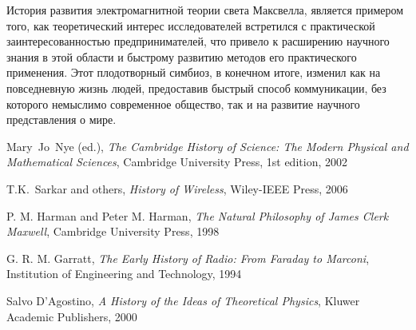 \documentclass[12pt, oneside, a4paper]{article}
\begin{document}
История развития электромагнитной теории света Максвелла, является примером того, как теоретический интерес исследователей встретился с практической заинтересованностью предпринимателей, что привело  к расширению научного знания в этой области и быстрому развитию методов его практического применения. Этот плодотворный симбиоз, в конечном итоге, изменил как на повседневную жизнь людей, предоставив быстрый способ коммуникации, без которого немыслимо современное общество, так и на развитие научного представления о мире.  
\clearpage
{} 
\begin{thebibliography}{9}
 Mary~Jo~Nye (ed.), \emph{The Cambridge History of Science: The Modern Physical and Mathematical Sciences}, Cambridge University Press, 1st edition, 2002

 T.K.~Sarkar and others, \emph{History of Wireless}, Wiley-IEEE Press, 2006

 P. M. Harman and Peter M. Harman, \emph{The Natural Philosophy of James Clerk Maxwell},  Cambridge University Press, 1998

G. R. M. Garratt, \emph{The Early History of Radio: From Faraday to Marconi},  Institution of Engineering and Technology, 1994

Salvo D'Agostino, \emph{A History of the Ideas of Theoretical Physics}, Kluwer Academic Publishers, 2000 

\end{thebibliography}
\end{document}
